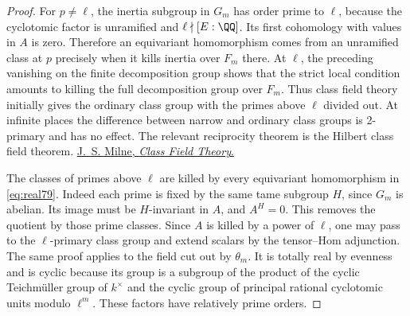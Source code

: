 \documentclass[a4paper,11pt]{article}
\theoremstyle{definition}
\theoremstyle{remark}
\numberwithin{equation}{section}
\begin{document}
\begin{proof}
For \(p\ne\ell\), the inertia subgroup in \(G_m\) has order
prime to \(\ell\), because the cyclotomic factor is unramified
and \(\ell\nmid[E:\QQ]\). Its first cohomology with values in
\(A\) is zero. Therefore an equivariant homomorphism comes
from an unramified class at \(p\) precisely when it kills
inertia over \(F_m\) there. At \(\ell\), the preceding vanishing
on the finite decomposition group shows that the strict local
condition amounts to killing the full decomposition group over
\(F_m\). Thus class field theory initially gives the ordinary
class group with the primes above \(\ell\) divided out. At
infinite places the difference between narrow and ordinary
class groups is 2-primary and has no effect. The relevant
reciprocity theorem is the Hilbert class field theorem.
\href{https://www.jmilne.org/math/CourseNotes/CFT.pdf}{J.~S. Milne,
\emph{Class Field Theory}.}

The classes of primes above \(\ell\) are killed by every
equivariant homomorphism in \eqref{eq:real79}. Indeed each
prime is fixed by the same tame subgroup \(H\), since \(G_m\)
is abelian. Its image must be \(H\)-invariant in \(A\), and
\(A^H=0\). This removes the quotient by those prime classes.
Since \(A\) is killed by a power of \(\ell\), one may pass to
the \(\ell\)-primary class group and extend scalars by the
tensor--Hom adjunction. The same proof applies to the field
cut out by \(\theta_m\). It is totally real by evenness and
is cyclic because its group is a subgroup of the product of
the cyclic Teichm\"uller group of \(k^\times\) and the cyclic
group of principal rational cyclotomic units modulo
\(\ell^m\). These factors have relatively prime orders.
\end{proof}
\end{document}
